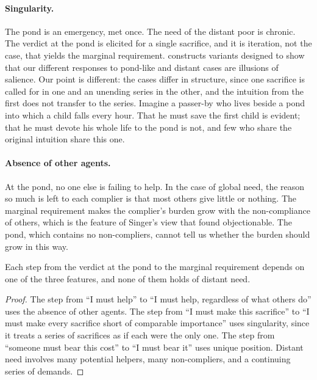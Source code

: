 \documentclass{situationist-preprint}
\begin{document}
\paragraph{Singularity.} The pond is an emergency, met once. The need of the distant poor is chronic. The verdict at the pond is elicited for a single sacrifice, and it is iteration, not the case, that yields the marginal requirement. \citet{Unger1996} constructs variants designed to show that our different responses to pond-like and distant cases are illusions of salience. Our point is different: the cases differ in structure, since one sacrifice is called for in one and an unending series in the other, and the intuition from the first does not transfer to the series. Imagine a passer-by who lives beside a pond into which a child falls every hour. That he must save the first child is evident; that he must devote his whole life to the pond is not, and few who share the original intuition share this one.

\paragraph{Absence of other agents.} At the pond, no one else is failing to help. In the case of global need, the reason so much is left to each complier is that most others give little or nothing. The marginal requirement makes the complier's burden grow with the non-compliance of others, which is the feature of Singer's view that \citet{Murphy2000} found objectionable. The pond, which contains no non-compliers, cannot tell us whether the burden should grow in this way.

\begin{proposition}\label{p:limits}
Each step from the verdict at the pond to the marginal requirement depends on one of the three features, and none of them holds of distant need.
\end{proposition}

\begin{proof}
The step from \enquote{I must help} to \enquote{I must help, regardless of what others do} uses the absence of other agents. The step from \enquote{I must make this sacrifice} to \enquote{I must make every sacrifice short of comparable importance} uses singularity, since it treats a series of sacrifices as if each were the only one. The step from \enquote{someone must bear this cost} to \enquote{I must bear it} uses unique position. Distant need involves many potential helpers, many non-compliers, and a continuing series of demands.
\end{proof}
\end{document}
